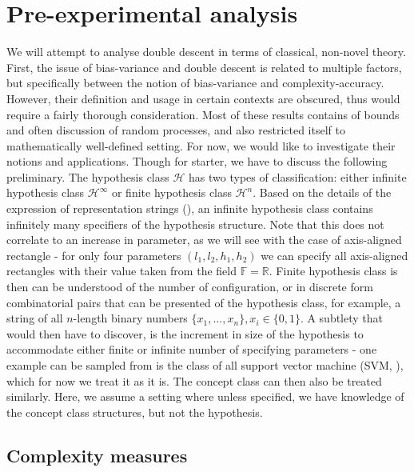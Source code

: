 \documentclass{article}
\begin{document}
\section{Pre-experimental analysis}
We will attempt to analyse double descent in terms of classical, non-novel theory. First, the issue of bias-variance and double descent is related to multiple factors, but specifically between the notion of bias-variance and complexity-accuracy. However, their definition and usage in certain contexts are obscured, thus would require a fairly thorough consideration. Most of these results contains of bounds and often discussion of random processes, and also restricted itself to mathematically well-defined setting. For now, we would like to investigate their notions and applications. Though for starter, we have to discuss the following preliminary. The hypothesis class $\mathcal{H}$ has two types of classification: either infinite hypothesis class $\mathcal{H}^{\infty}$ or finite hypothesis class $\mathcal{H}^{n}$. Based on the details of the expression of representation strings (\cite{10.5555/200548}), an infinite hypothesis class contains infinitely many specifiers of the hypothesis structure. Note that this does not correlate to an increase in parameter, as we will see with the case of axis-aligned rectangle - for only four parameters $(l_{1},l_{2},h_{1},h_2)$ we can specify all axis-aligned rectangles with their value taken from the field $\mathbb{F}=\mathbb{R}$. Finite hypothesis class is then can be understood of the number of configuration, or in discrete form combinatorial pairs that can be presented of the hypothesis class, for example, a string of all $n$-length binary numbers $\{x_{1},\dots,x_{n}\}, x_{i}\in \{0,1\}$. A subtlety that would then have to discover, is the increment in size of the hypothesis to accommodate either finite or infinite number of specifying parameters - one example can be sampled from is the class of all support vector machine (SVM, \cite{Vapnik1999-VAPTNO}), which for now we treat it as it is. The concept class can then also be treated similarly. Here, we assume a setting where unless specified, we have knowledge of the concept class structures, but not the hypothesis. 
\subsection{Complexity measures}
\end{document}
